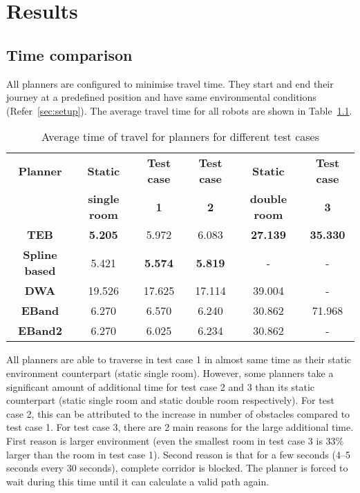 
\chapter{Results}


\section{Time comparison}%
\label{sec:time_comparison}


All planners are configured to minimise travel time. They start and end their journey at a predefined
position and have same environmental conditions (Refer~\ref{sec:setup}). The average travel time for all robots are shown
in Table~\ref{tab:avg_time_planner_comp}. 

\begin{table}[!htpb]
    \centering
    \begin{tabular}{cccccc}\toprule
        \textbf{Planner} & \textbf{Static} & \textbf{Test case} & \textbf{Test case} & \textbf{Static} & \textbf{Test case} \\
                         & \textbf{single room} & \textbf{1} & \textbf{2} & \textbf{double room}       & \textbf{3} \\\toprule
        \textbf{TEB         } & \textbf{5.205}  & 5.972  & 6.083  & \textbf{27.139} & \textbf{35.330} \\
        \textbf{Spline based} & 5.421  & \textbf{5.574}  & \textbf{5.819}  & \--    & \--    \\
        \textbf{DWA         } & 19.526 & 17.625 & 17.114 & 39.004 & \-- \\
        \textbf{EBand       } & 6.270  & 6.570  & 6.240  & 30.862 & 71.968 \\
        \textbf{EBand2      } & 6.270  & 6.025  & 6.234  & 30.862 & \-- \\
        \bottomrule
    \end{tabular}
    \caption{Average time of travel for planners for different test cases}\label{tab:avg_time_planner_comp}
\end{table}

All planners are able to traverse in test case 1 in almost
same time as their static environment counterpart (static single room). However, some planners take a 
significant amount of additional time for test case 2 and 3 than its static counterpart (static 
single room and static double room respectively). For test case 2, this can be attributed to the 
increase in number of obstacles compared to test case 1. For test case 3, there are 2 main reasons
for the large additional time. First reason is larger environment (even the smallest room in test
case 3 is 33\% larger than the room in test case 1). Second reason is that for a few seconds (4--5 
seconds every 30 seconds), complete corridor is blocked. The planner is forced to wait during this 
time until it can calculate a valid path again. 

